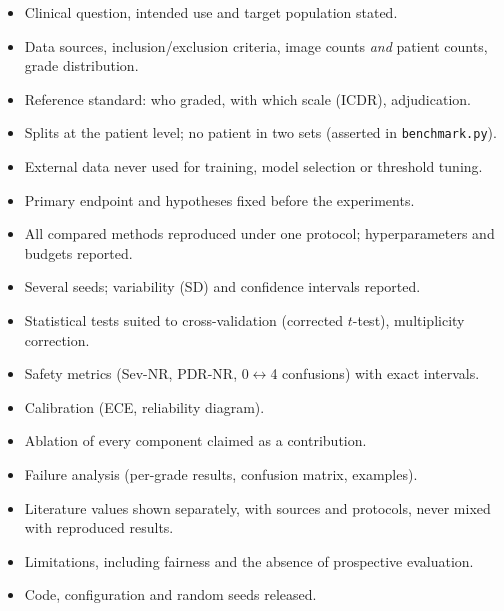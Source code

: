 \begin{itemize}\small
\item[$\square$] Clinical question, intended use and target population stated.
\item[$\square$] Data sources, inclusion/exclusion criteria, image counts \emph{and} patient counts, grade distribution.
\item[$\square$] Reference standard: who graded, with which scale (ICDR), adjudication.
\item[$\square$] Splits at the patient level; no patient in two sets (asserted in \texttt{benchmark.py}).
\item[$\square$] External data never used for training, model selection or threshold tuning.
\item[$\square$] Primary endpoint and hypotheses fixed before the experiments.
\item[$\square$] All compared methods reproduced under one protocol; hyperparameters and budgets reported.
\item[$\square$] Several seeds; variability (SD) and confidence intervals reported.
\item[$\square$] Statistical tests suited to cross-validation (corrected $t$-test), multiplicity correction.
\item[$\square$] Safety metrics (Sev-NR, PDR-NR, 0$\leftrightarrow$4 confusions) with exact intervals.
\item[$\square$] Calibration (ECE, reliability diagram).
\item[$\square$] Ablation of every component claimed as a contribution.
\item[$\square$] Failure analysis (per-grade results, confusion matrix, examples).
\item[$\square$] Literature values shown separately, with sources and protocols, never mixed with reproduced results.
\item[$\square$] Limitations, including fairness and the absence of prospective evaluation.
\item[$\square$] Code, configuration and random seeds released.
\end{itemize}
